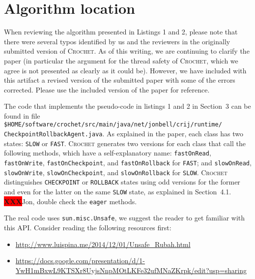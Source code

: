 \documentclass[12pt]{article}
\newcommand{\vm}[1]{\colorbox{green!20}{\texttt{\color{black}#1}}}
\newcommand{\XXX}{\colorbox{red}{\bf\color{white}XXX}}
\newcommand{\sysname}{\textsc{Crochet}\xspace}
\begin{document}
\section{Algorithm location}
\label{sec:algorithm}

When reviewing the algorithm presented in Listings 1 and 2, please note that there were several typos identified by us and the reviewers in the originally submitted version of \sysname. As of this writing, we are continuing to clarify the paper (in particular the argument for the thread safety of \sysname, which we agree is not presented as clearly as it could be). However, we have included with this artifact a revised version of the submitted paper with some of the errors corrected. Please use the included version of the paper for reference.

The code that implements the pseudo-code in listings 1 and 2 in Section~3 can be
found in file\\
\vm{\$HOME/software/crochet/src/main/java/net/jonbell/crij/runtime/}\\\vm{CheckpointRollbackAgent.java}.
As explained in the paper, each class has two states:  \texttt{SLOW} or
\texttt{FAST}.  \sysname generates two versions for each class that call the
following methods, which have a self-explanatory name: \texttt{fastOnRead},
\texttt{fastOnWrite}, \texttt{fastOnCheckpoint}, and \texttt{fastOnRollback} for
\texttt{FAST}; and \texttt{slowOnRead}, \texttt{slowOnWrite},
\texttt{slowOnCheckpoint}, and \texttt{slowOnRollback} for \texttt{SLOW}.
\sysname distinguishes \texttt{CHECKPOINT} or \texttt{ROLLBACK} states using
odd versions for the former and even for the latter on the same \texttt{SLOW}
state, as explained in Section~4.1. \XXX Jon, double check the \texttt{eager}
methods.

The real code uses \texttt{sun.misc.Unsafe}, we suggest the reader to get
familiar with this API.  Consider reading the following resources first:

\begin{itemize}

    \item \url{http://www.luispina.me/2014/12/01/Unsafe_Rubah.html}

    \item \href{https://docs.google.com/presentation/d/1-YwH1mBxwL9KTSXr8UyjsNnpMOtLKFe32ufMNaZKrpk/edit?usp=sharing}{https://docs.google.com/presentation/d/1-\\YwH1mBxwL9KTSXr8UyjsNnpMOtLKFe32ufMNaZKrpk/edit?usp=sharing}

\end{itemize}
\end{document}
